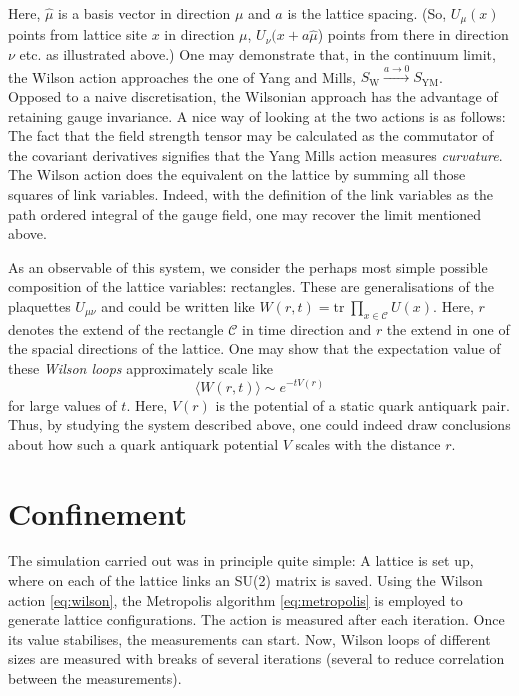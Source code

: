 \documentclass{scrartcl}
\begin{document}
Here, $\hat{\mu}$ is a basis vector in direction $\mu$ and $a$ is the lattice spacing.
(So, $U_\mu(x)$ points from lattice site $x$ in direction $\mu$,
$U_\nu(x + a \hat{\mu}$) points from there in direction $\nu$ etc. as illustrated
above.)
One may demonstrate that, in the continuum limit, the Wilson action approaches
the one of Yang and Mills, $S_\text{W} \xrightarrow{a\rightarrow 0} S_\text{YM}$.
~\cite{gattringerLang}
Opposed to a naive discretisation, the Wilsonian approach has the advantage of
retaining gauge invariance. A nice way of looking at the two actions is as follows:
The fact that the field strength tensor may be calculated as the commutator of the
covariant derivatives signifies that the Yang Mills action measures \emph{curvature}.
The Wilson action does the equivalent on the lattice by summing all those squares of
link variables. Indeed, with the definition of the link variables as the path
ordered integral of the gauge field, one may recover the limit mentioned above.

As an observable of this system, we consider the perhaps most simple possible
composition of the lattice variables: rectangles. These are generalisations of the
plaquettes $U_{\mu \nu}$ and could be written like
$W(r,t) = \text{tr} \; \prod_{x \in \mathcal{C}} U(x)$.
Here, $r$ denotes the extend of the rectangle $\mathcal{C}$ in time direction and $r$
the extend in one of the spacial directions of the lattice. One may show that
the expectation value of these \emph{Wilson loops} approximately scale like
~\cite{loopsStaticPotRothe}
\begin{equation} \label{eq:wilsonLoop}
    \langle W(r,t) \rangle \sim e^{-t V(r)}
\end{equation}
for large values of $t$. Here, $V(r)$ is the potential of a static quark antiquark
pair. Thus, by studying the system described above, one could indeed draw conclusions
about how such a quark antiquark potential $V$ scales with the distance $r$.

\section{Confinement} \label{sec:confinement}
The simulation carried out was in principle quite simple: A lattice is set up,
where on each of the lattice links an SU(2) matrix is saved. Using the Wilson
action \eqref{eq:wilson}, the Metropolis algorithm \eqref{eq:metropolis} is
employed to generate lattice configurations. The action is measured after each
iteration. Once its value stabilises, the measurements can start. Now, Wilson
loops of different sizes are measured with breaks of several iterations (several
to reduce correlation between the measurements).
\end{document}
